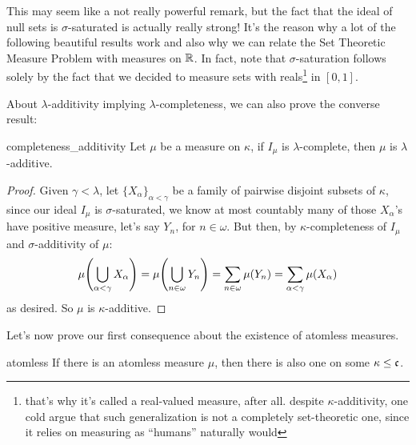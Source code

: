This may seem like a not really powerful remark, but the fact that the ideal of null sets is $\sigma$-saturated is actually really strong! It's the reason why a lot of the following beautiful results work and also why we can relate the Set Theoretic Measure Problem with measures on $\mathbb{R}$. In fact, note that $\sigma$-saturation follows solely by the fact that we decided to measure sets with reals\footnote{that's why it's called a real-valued measure, after all. despite $\kappa$-additivity, one cold argue that such generalization is not a completely set-theoretic one, since it relies on measuring as ``humans'' naturally would} in $[0,1]$.

About $\lambda$-additivity implying $\lambda$-completeness, we can also prove the converse result:

\begin{lemma}{}{completeness_additivity}
    Let $\mu$ be a measure on $\kappa$, if $I_\mu$ is $\lambda$-complete, then $\mu$ is $\lambda$-additive.
\end{lemma}

\begin{proof}
    Given $\gamma<\lambda$, let $\{X_\alpha\}_{\alpha<\gamma}$ be a family of pairwise disjoint subsets of $\kappa$, since our ideal $I_\mu$ is $\sigma$-saturated, we know at most countably many of those $X_\alpha$'s have positive measure, let's say $Y_n$, for $n\in\omega$. But then, by $\kappa$-completeness of $I_\mu$ and $\sigma$-additivity of $\mu$:
    $$\mu{\left(\bigcup_{\alpha<\gamma}X_\alpha\right)}=\mu{\left(\bigcup_{n\in\omega}Y_n\right)}=\sum_{n\in\omega}\mu(Y_n)=\sum_{\alpha<\gamma}\mu(X_\alpha)$$
    as desired. So $\mu$ is $\kappa$-additive.
\end{proof}

Let's now prove our first consequence about the existence of atomless measures.

\begin{theorem}{}{atomless}
    If there is an atomless measure $\mu$, then there is also one on some $\kappa\leq\mathfrak{c}$.
\end{theorem}

